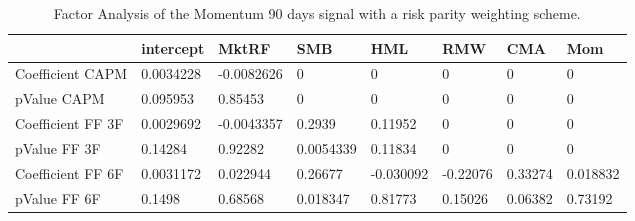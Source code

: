 \begin{table}[H]
\centering
\begin{tabular}{llllllll}
& intercept & MktRF & SMB & HML & RMW & CMA & Mom \\ 
\hline 
Coefficient CAPM & 0.0034228 & -0.0082626 & 0 & 0 & 0 & 0 & 0 \\ 
pValue CAPM & 0.095953 & 0.85453 & 0 & 0 & 0 & 0 & 0 \\ 
Coefficient FF 3F & 0.0029692 & -0.0043357 & 0.2939 & 0.11952 & 0 & 0 & 0 \\ 
pValue FF 3F & 0.14284 & 0.92282 & 0.0054339 & 0.11834 & 0 & 0 & 0 \\ 
Coefficient FF 6F & 0.0031172 & 0.022944 & 0.26677 & -0.030092 & -0.22076 & 0.33274 & 0.018832 \\ 
pValue FF 6F & 0.1498 & 0.68568 & 0.018347 & 0.81773 & 0.15026 & 0.06382 & 0.73192 \\ 
\hline
\end{tabular}
\caption{Factor Analysis of the Momentum 90 days signal with a risk parity weighting scheme.}
\label{MOM90RP_FACTOR}
\end{table}